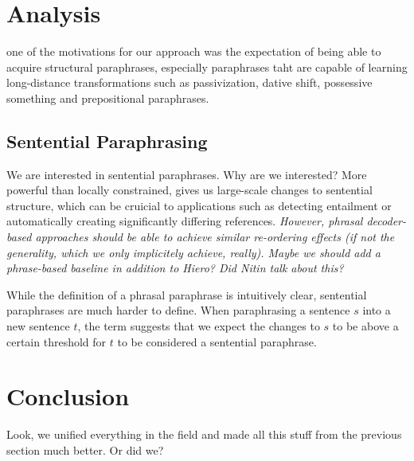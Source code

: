 \documentclass[11pt]{article}
\begin{document}
\section{Analysis} \label{analysis}

one of the motivations for our approach was the expectation of being
able to acquire structural paraphrases, especially paraphrases taht
are capable of learning long-distance transformations such as
passivization, dative shift, possessive something and prepositional
paraphrases.

\subsection{Sentential Paraphrasing} \label{sentential_paraphrasing}

We are interested in sentential paraphrases. Why are we interested?
More powerful than locally constrained, gives us large-scale changes
to sentential structure, which can be cruicial to applications such as
detecting entailment or automatically creating significantly differing
references. \emph{However, phrasal decoder-based approaches should be
  able to achieve similar re-ordering effects (if not the generality,
  which we only implicitely achieve, really). Maybe we should add a
  phrase-based baseline in addition to Hiero? Did Nitin talk about
  this?}

While the definition of a phrasal paraphrase is intuitively clear,
sentential paraphrases are much harder to define. When paraphrasing a
sentence $s$ into a new sentence $t$, the term suggests that we expect
the changes to $s$ to be above a certain threshold for $t$ to be
considered a sentential paraphrase. 

\section{Conclusion} \label{conclusion}

Look, we unified everything in the field and made all this stuff from
the previous section much better. Or did we?

\newpage




\nocite{*}
\end{document}
